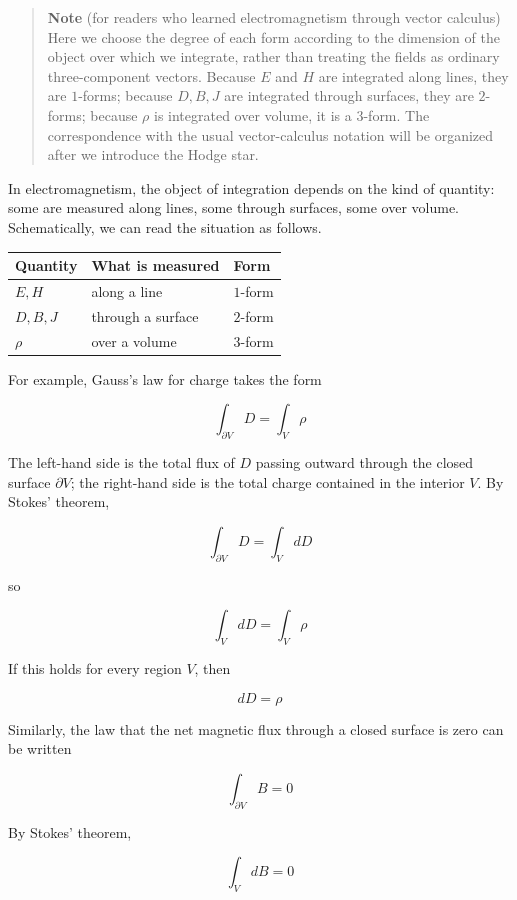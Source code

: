 \documentclass[a4paper,12pt,openany]{book}
\begin{document}
\begin{quote}
\textbf{Note} (for readers who learned electromagnetism through vector
calculus) Here we choose the degree of each form according to the
dimension of the object over which we integrate, rather than treating
the fields as ordinary three-component vectors. Because \(E\) and \(H\)
are integrated along lines, they are \(1\)-forms; because \(D,B,J\) are
integrated through surfaces, they are \(2\)-forms; because \(\rho\) is
integrated over volume, it is a \(3\)-form. The correspondence with the
usual vector-calculus notation will be organized after we introduce the
Hodge star.
\end{quote}

In electromagnetism, the object of integration depends on the kind of
quantity: some are measured along lines, some through surfaces, some
over volume. Schematically, we can read the situation as follows.

\begin{longtable}[]{@{}lll@{}}
\toprule\noalign{}
Quantity & What is measured & Form \\
\midrule\noalign{}
\endhead
\bottomrule\noalign{}
\endlastfoot
\(E,H\) & along a line & \(1\)-form \\
\(D,B,J\) & through a surface & \(2\)-form \\
\(\rho\) & over a volume & \(3\)-form \\
\end{longtable}

For example, Gauss's law for charge takes the form

\[
\int_{\partial V}D=\int_V\rho
\]

The left-hand side is the total flux of \(D\) passing outward through
the closed surface \(\partial V\); the right-hand side is the total
charge contained in the interior \(V\). By Stokes' theorem,

\[
\int_{\partial V}D=\int_V dD
\]

so

\[
\int_V dD=\int_V\rho
\]

If this holds for every region \(V\), then

\[
dD=\rho
\]

Similarly, the law that the net magnetic flux through a closed surface
is zero can be written

\[
\int_{\partial V}B=0
\]

By Stokes' theorem,

\[
\int_V dB=0
\]
\end{document}
